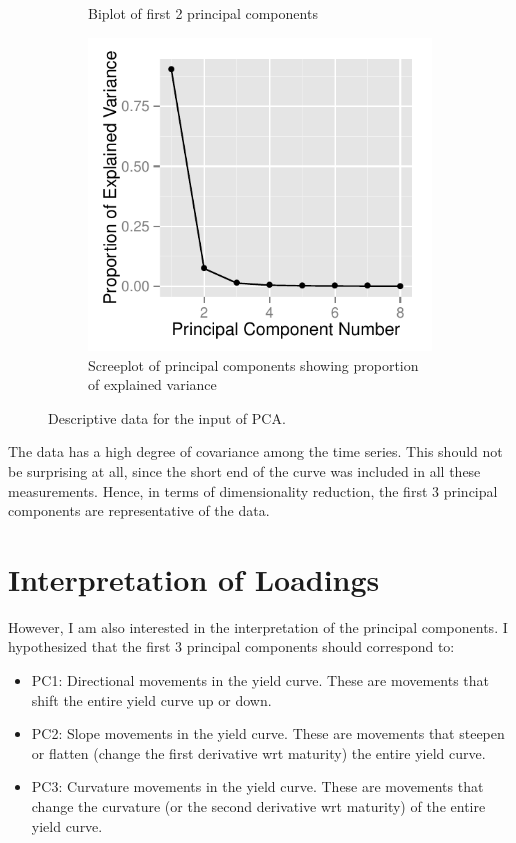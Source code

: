 \documentclass[11pt]{scrreprt}
\begin{document}
\begin{figure}[H]
\begin{subfigure}{.3\textwidth}
\caption{Biplot of first 2 principal components}
\end{subfigure}
\begin{subfigure}{.3\textwidth}
\centering\includegraphics[]{screeplot-vanilla-returns.pdf}
\caption{Screeplot of principal components showing proportion of explained variance}
\end{subfigure}
\caption{Descriptive data for the input of PCA.}
\label{fig:descriptive-pca-vanilla}
\end{figure}

The data has a high degree of covariance among the time series. This should not be surprising at all, since the short end of the curve was included in all these measurements. Hence, in terms of dimensionality reduction, the first 3 principal components are representative of the data.

\section{Interpretation of Loadings}

However, I am also interested in the interpretation of the principal components. I hypothesized that the first 3 principal components should correspond to:

\begin{itemize}
\item PC1: Directional movements in the yield curve. These are movements that shift the entire yield curve up or down.
\item PC2: Slope movements in the yield curve. These are movements that steepen or flatten (change the first derivative wrt maturity) the entire yield curve.
\item PC3: Curvature movements in the yield curve. These are movements that change the curvature (or the second derivative wrt maturity) of the entire yield curve.
\end{itemize}
\end{document}
